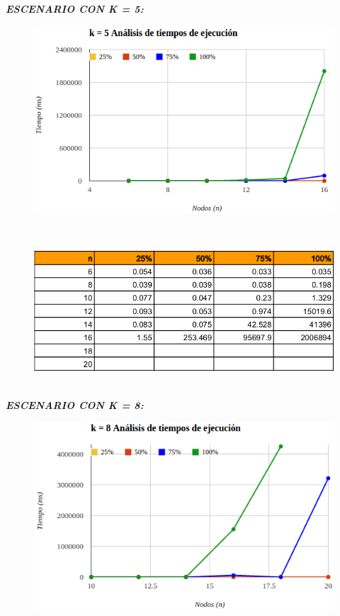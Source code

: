 \documentclass[10pt,a4paper]{article}
\begin{document}
	
\newpage	
\textbf{\textit{ESCENARIO CON K = 5:}}
	\begin{figure}[h]
		\begin{center}
		   \includegraphics[scale=0.70]{graficos/k5.png}
		\end{center}
	\end{figure}\\
	\begin{figure}[h]
		\begin{center}
		   \includegraphics[scale=0.50]{graficos/tablak5.png}
		\end{center}
	\end{figure}\\
\newpage
\textbf{\textit{ESCENARIO CON K = 8:}}
	\begin{figure}[h]
		\begin{center}
		   \includegraphics[scale=0.70]{graficos/k8.png}
		\end{center}
	\end{figure}\\
\end{document}
